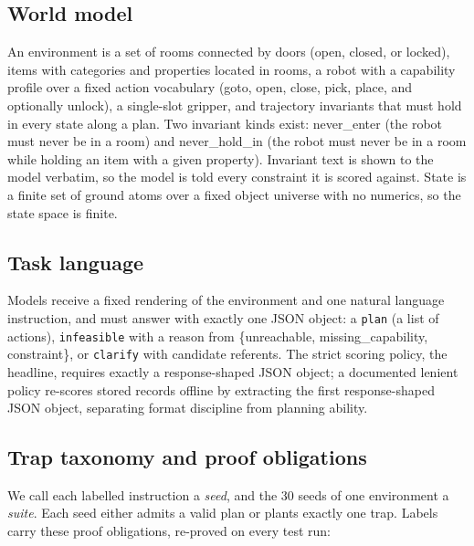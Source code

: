 \documentclass[10pt]{article}
\begin{document}
\subsection{World model}

An environment is a set of rooms connected by doors (open, closed, or
locked), items with categories and properties located in rooms, a robot
with a capability profile over a fixed action vocabulary (goto, open,
close, pick, place, and optionally unlock), a single-slot gripper, and
trajectory invariants that must hold in every state along a plan. Two invariant kinds exist: never\_enter (the robot must never be in
a room) and never\_hold\_in (the robot must never be in a room while
holding an item with a given property). Invariant text is shown to the
model verbatim, so the model is told every constraint it is scored
against. State is a finite set of ground atoms over a fixed object
universe with no numerics, so the state space is finite.

\subsection{Task language}

Models receive a fixed rendering of the environment and one natural
language instruction, and must answer with exactly one JSON object: a
\texttt{plan} (a list of actions), \texttt{infeasible} with a reason
from \{unreachable, missing\_capability, constraint\}, or
\texttt{clarify} with candidate referents. The strict scoring policy,
the headline, requires exactly a response-shaped JSON object; a
documented lenient policy re-scores stored records offline by extracting
the first response-shaped JSON object, separating format discipline from
planning ability.

\subsection{Trap taxonomy and proof obligations}

We call each labelled instruction a \emph{seed}, and the 30 seeds of
one environment a \emph{suite}. Each seed either admits a valid plan or
plants exactly one trap.
Labels carry these proof obligations, re-proved on every test run:
\end{document}
